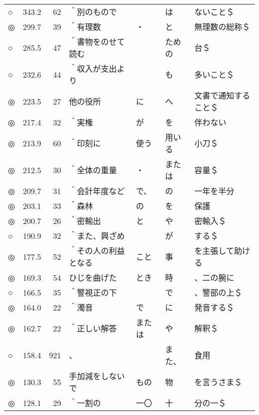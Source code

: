 \begin{table*}[p]
\begin{center}
\begin{tabular}[h]{|l@{ }|r@{ }|r@{ }|l@{ }|l@{ }|l@{ }|l@{ }|}
○   & 343.2 &  62 & ＾別のもので         &            & は         & ないこと＄          \\
◎   & 299.7 &  39 & ＾有理数             & ・         & と         & 無理数の総称＄      \\
○   & 285.5 &  47 & ＾書物をのせて読む   &            & ための     & 台＄                \\
○   & 232.6 &  44 & ＾収入が支出より     &            & も         & 多いこと＄          \\
◎   & 223.5 &  27 & 他の役所             & に         & へ         & 文書で通知すること＄\\
◎   & 217.4 &  32 & ＾実権               & が         & を         & 伴わない            \\
◎   & 213.9 &  60 & ＾印刻に             & 使う       & 用いる     & 小刀＄              \\
◎   & 212.5 &  30 & ＾全体の重量         & ・         & または     & 容量＄              \\
◎   & 209.7 &  31 & ＾会計年度など       & で、       & の         & 一年を半分          \\
◎   & 203.1 &  33 & ＾森林               & の         & を         & 保護                \\
◎   & 200.7 &  26 & ＾密輸出             & と         & や         & 密輸入＄            \\
○   & 190.9 &  32 & ＾また、興ざめ       &            & が         & する＄              \\
◎   & 177.5 &  52 & ＾その人の利益となる & こと       & 事         & を主張して助ける\\
◎   & 169.3 &  54 & ひじを曲げた         & とき       & 時         & 、二の腕に          \\
○   & 166.5 &  35 & ＾警視正の下         &            & で         & 、警部の上＄        \\
◎   & 164.0 &  22 & ＾濁音               & で         & に         & 発音する＄          \\
◎   & 162.7 &  22 & ＾正しい解答         & または     & や         & 解釈＄              \\
○   & 158.4 & 921 & 、                   &            & また、     & 食用                \\
◎   & 130.3 &  55 & 手加減をしないで     & もの       & 物         & を言うさま＄        \\
◎   & 128.1 &  29 & ＾一割の             & 一〇       & 十         & 分の一＄            \\

\end{tabular}
\end{center}
\end{table*}
